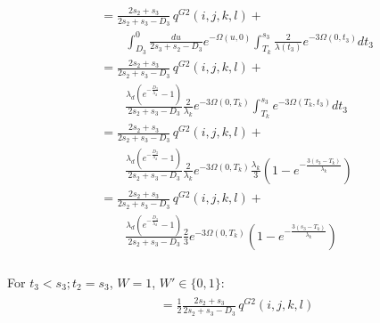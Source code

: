 \documentclass{article}
\begin{document}
\begin{align}
    \begin{split}
        &= \frac{2s_2+s_3}{2s_2+s_3-D_3}\,q^{G2}(i,j,k,l)+\\
        &\qquad
        \int_{D_3}^{0}\frac{du}{2s_3+s_2-D_3}e^{-\Omega(u,0)}\int_{T_k}^{s_3}\frac{2}{\lambda(t_3)}e^{-3\Omega(0,t_3)}dt_3\\
        &= \frac{2s_2+s_3}{2s_2+s_3-D_3}\,q^{G2}(i,j,k,l)+\\
        &\qquad
        \frac{\lambda_d\left(e^{-\frac{D_3}{\lambda_d}}-1\right)}{2s_2+s_3-D_3}\frac{2}{\lambda_k}e^{-3\Omega(0,T_k)}\int_{T_k}^{s_3}e^{-3\Omega(T_k,t_3)}dt_3\\
        &= \frac{2s_2+s_3}{2s_2+s_3-D_3}\,q^{G2}(i,j,k,l)+\\
        &\qquad
        \frac{\lambda_d\left(e^{-\frac{D_3}{\lambda_d}}-1\right)}{2s_2+s_3-D_3}\frac{2}{\lambda_k}e^{-3\Omega(0,T_k)}\frac{\lambda_k}{3}\left(1-e^{-\frac{3(s_3-T_k)}{\lambda_k}}\right)\\
        &= \frac{2s_2+s_3}{2s_2+s_3-D_3}\,q^{G2}(i,j,k,l)+\\
        &\qquad
        \frac{\lambda_d\left(e^{-\frac{D_3}{\lambda_d}}-1\right)}{2s_2+s_3-D_3}\frac{2}{3}e^{-3\Omega(0,T_k)}\left(1-e^{-\frac{3(s_3-T_k)}{\lambda_k}}\right)\\
    \end{split}
\end{align}

For $t_3<s_3;t_2=s_3$, $W = 1$, $W' \in \{0,1\}$:
\begin{align}
    \begin{split}
        &= \frac{1}{2}\frac{2s_2+s_3}{2s_2+s_3-D_3}\,q^{G2}(i,j,k,l)\\
    \end{split}
\end{align}
\end{document}
